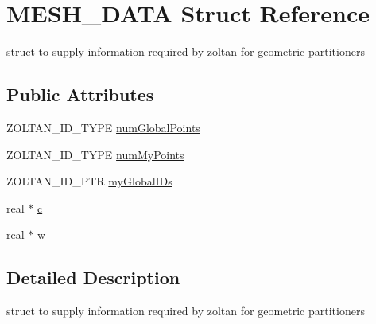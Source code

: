 \hypertarget{structMESH__DATA}{
\section{MESH\_\-DATA Struct Reference}
\label{structMESH__DATA}
}


struct to supply information required by zoltan for geometric partitioners  
\subsection*{Public Attributes}
\begin{DoxyCompactItemize}
\item 
ZOLTAN\_\-ID\_\-TYPE \hyperlink{structMESH__DATA_a25c50153be30ddfd4e2631f9a5c2f2fb}{numGlobalPoints}
\item 
ZOLTAN\_\-ID\_\-TYPE \hyperlink{structMESH__DATA_afb64042a79ca9c51cec37b8f1a5d867d}{numMyPoints}
\item 
ZOLTAN\_\-ID\_\-PTR \hyperlink{structMESH__DATA_a483f28fc265f4b7cd24bec6d809cc7e6}{myGlobalIDs}
\item 
real $\ast$ \hyperlink{structMESH__DATA_a8238c727c5259e5124dc1577e2d4f486}{c}
\item 
real $\ast$ \hyperlink{structMESH__DATA_adb92ab23a818023527c39a97ed998249}{w}
\end{DoxyCompactItemize}


\subsection{Detailed Description}
struct to supply information required by zoltan for geometric partitioners 

